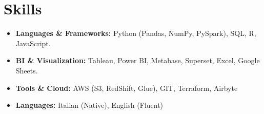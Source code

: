 \documentclass[10pt, letterpaper]{article}
\begin{document}
    \section{Skills}
\begin{itemize}[leftmargin=*,noitemsep,topsep=0pt]

\item \textbf{Languages \& Frameworks:} Python (Pandas, NumPy, PySpark), SQL, R, JavaScript.
\item \textbf{BI \& Visualization:} Tableau, Power BI, Metabase, Superset, Excel, Google Sheets.
\item \textbf{Tools \& Cloud:} AWS (S3, RedShift, Glue), GIT, Terraform, Airbyte
\item \textbf{Languages:} Italian (Native), English (Fluent)
\end{itemize}


    
\end{document}
